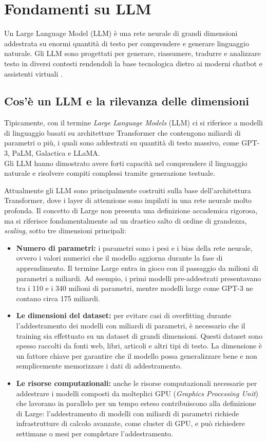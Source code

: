 \section{Fondamenti su LLM}
Un Large Language Model (LLM) è una rete neurale di grandi dimensioni addestrata su enormi quantità di testo per comprendere e generare linguaggio naturale. Gli LLM sono progettati per generare, riassumere, tradurre e analizzare testo in diversi contesti rendendoli la base tecnologica dietro ai moderni chatbot e assistenti virtuali \cite{Definizione_LLM}.

\subsection{Cos'è un LLM e la rilevanza delle dimensioni}
Tipicamente, con il termine \textit{Large Language Models} (LLM) ci si riferisce a modelli di linguaggio basati su architetture Transformer che contengono miliardi di parametri o più, i quali sono addestrati su quantità di testo massivo, come GPT-3, PaLM, Galactica e LLaMA.\\
Gli LLM hanno dimostrato avere forti capacità nel comprendere il linguaggio naturale e risolvere compiti complessi tramite generazione testuale.

Attualmente gli LLM sono principalmente costruiti sulla base dell'architettura Transformer, dove i layer di attenzione sono impilati in una rete neurale molto profonda.
Il concetto di Large non presenta una definizione accademica rigorosa, ma si riferisce fondamentalmente ad un drastico salto di ordine di grandezza, \textit{scaling}, sotto tre dimensioni principali:

\begin{itemize}
    \item \textbf{Numero di parametri:} i parametri sono i pesi e i bias della rete neurale, ovvero i valori numerici che il modello aggiorna durante la fase di apprendimento. Il termine Large entra in gioco con il passaggio da milioni di parametri a miliardi. Ad esempio, i primi modelli pre-addestrati presentavano tra i 110 e i 340 milioni di parametri, mentre modelli large come GPT-3 ne contano circa 175 miliardi.
    \item \textbf{Le dimensioni del dataset:} per evitare casi di overfitting durante l'addestramento dei modelli con miliardi di parametri, è necessario che il training sia effettuato su un dataset di grandi dimensioni. Questi dataset sono spesso raccolti da fonti web, libri, articoli e altri tipi di testo. La dimensione è un fattore chiave per garantire che il modello possa generalizzare bene e non semplicemente memorizzare i dati di addestramento.
    \item \textbf{Le risorse computazionali:} anche le risorse computazionali necessarie per addestrare i modelli composti da molteplici GPU (\textit{Graphics Processing Unit}) che lavorano in parallelo per un tempo esteso contribuiscono alla definizione di Large: l'addestramento di modelli con miliardi di parametri richiede infrastrutture di calcolo avanzate, come cluster di GPU, e può richiedere settimane o mesi per completare l'addestramento.
\end{itemize}

